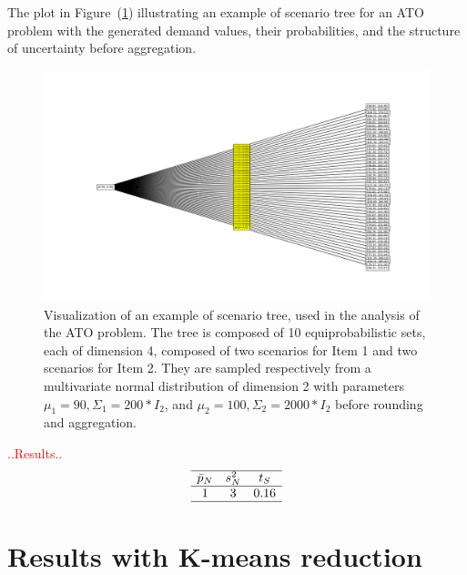 \documentclass[a4paper,12pt]{article}
\begin{document}
	
 	\noindent The plot in Figure~(\ref{fig:ato-scenariotree}) illustrating an example of scenario tree for an ATO problem  with the generated demand values, their probabilities, and the structure of uncertainty before aggregation.
 	
	\begin{figure}[htbp]
		\centering
		\includegraphics[width=1\textwidth]{../immagini/scenariATO.png}
		\caption{Visualization of an example of scenario tree, used in the analysis of the ATO problem. The tree is composed of 10 equiprobabilistic sets, each of dimension 4, composed of two scenarios for Item 1 and two scenarios for Item 2. They are sampled respectively from a multivariate normal distribution of dimension 2 with parameters $\mu_{1} = 90, \Sigma_{1} = 200 * I_{2}$, and $\mu_{2} = 100, \Sigma_{2} = 2000 * I_{2}$ before rounding and aggregation.}
		\label{fig:ato-scenariotree}
	\end{figure}
	
		\textcolor{red}{..Results..}
	\[
	\begin{array}{ccc}
		\hline
		\text{$\bar{p}_{N}$} & \text{$s_{N}^{2}$} & \text{$t_{S}$}\\
		\hline
		1 & 3 & 0.16 \\
		\hline
	\end{array}
	\]
	
	\label{tab:ATO-results-stat}
		
	\newpage
	\section{Results with K-means reduction}
	
\end{document}
